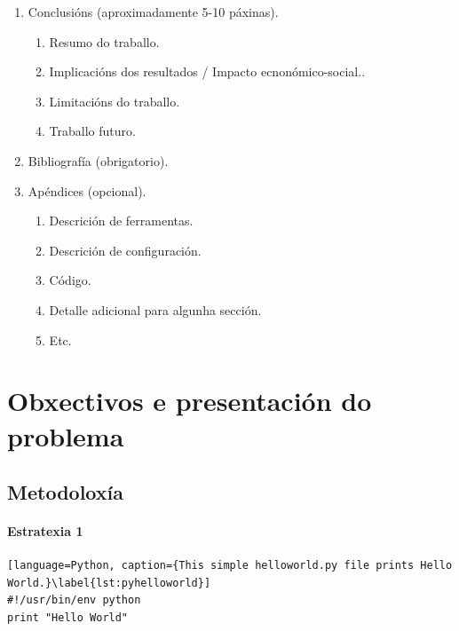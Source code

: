 \begin{enumerate}[noitemsep]
\begin{enumerate}[noitemsep]
    \end{enumerate}
    \item Conclusións (aproximadamente 5-10 páxinas).
    \begin{enumerate}[noitemsep]
        \item Resumo do traballo.
        \item Implicacións dos resultados / Impacto ecnonómico-social..
        \item Limitacións do traballo.
        \item Traballo futuro.
    \end{enumerate}
    \item Bibliografía (obrigatorio).
    \item Apéndices (opcional).
    \begin{enumerate}[noitemsep]
        \item Descrición de ferramentas.
        \item Descrición de configuración.
        \item Código. 
        \item Detalle adicional para algunha sección. 
        \item Etc. 
    \end{enumerate}
\end{enumerate}



\section{Obxectivos e presentación do problema}
\label{sec:intro:motivación}
{
\color{gray}
\Blindtext[3][1]

\cite{Jurgens:2000,Jurgens:1995,Miede:2011,Kohm:2011,Apple:keynote:2010,Apple:numbers:2010,Apple:pages:2010}

\cite{WEB:GNU:GPL:2010,WEB:Miede:2011}
}

\subsection{Metodoloxía}
\label{sec:intro:results:refs:method}
{
\color{gray}
\Blindtext[1][2]
}

\paragraph{Estratexia 1}
{
\color{gray}
\Blindtext[1][1]
}

\begin{lstlisting}[language=Python, caption={This simple helloworld.py file prints Hello World.}\label{lst:pyhelloworld}]
#!/usr/bin/env python
print "Hello World"
\end{lstlisting}


